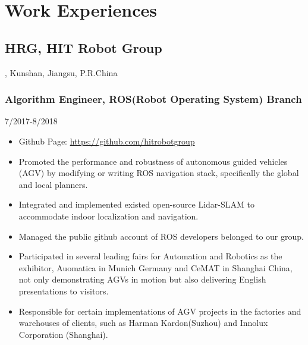 \documentclass{article}
\begin{document}
\section{Work Experiences}
\subsection{HRG, HIT Robot Group}, Kunshan, Jiangsu, P.R.China
\subsubsection{Algorithm Engineer, ROS(Robot Operating System) Branch} \hfill 7/2017-8/2018
\begin{itemize}[noitemsep,topsep=1pt]
\item Github Page: \url{https://github.com/hitrobotgroup}
\item Promoted the performance and robustness of autonomous guided vehicles (AGV) by modifying or writing ROS navigation stack, specifically the global and local planners.
\item Integrated and implemented existed open-source Lidar-SLAM to accommodate indoor localization and navigation.
\item Managed the public github account of ROS developers belonged to our group.  
\item Participated in several leading fairs for Automation and Robotics as the exhibitor, Auomatica in Munich Germany and CeMAT in Shanghai China, not only demonstrating AGVs in motion but also delivering English presentations to visitors. 
\item Responsible for certain implementations of AGV projects in the factories and warehouses of clients, such as Harman Kardon(Suzhou) and Innolux Corporation (Shanghai).  
\end{itemize}

\end{document}
